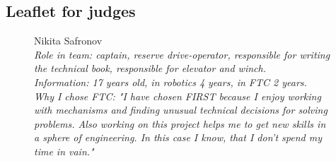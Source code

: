 \subsection{Leaflet for judges}

\begin{figure}[H]
	\begin{minipage}{0.3\linewidth}
		Nikita Safronov\\
		\emph{Role in team: captain, reserve drive-operator, responsible for writing the technical book, responsible for elevator and winch.\\}
		\emph{Information: 17 years old, in robotics 4 years, in FTC 2 years.\\} 
		\emph{Why I chose FTC: "I have chosen FIRST because I enjoy working with mechanisms and finding unusual technical decisions for solving problems. Also working on this project helps me to get new skills in a sphere of engineering. In this case I know, that I don't spend my time in vain."}				
	\end{minipage}
	\hfill
	\begin{minipage}{0.3\linewidth}
		\\
	\end{minipage}
\end{figure}